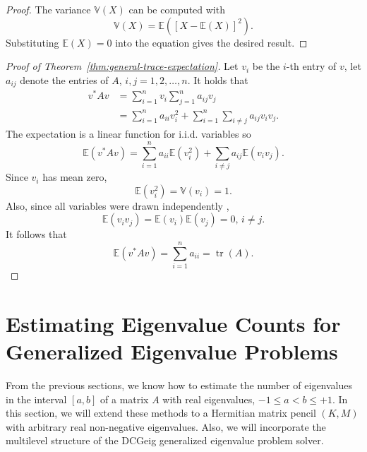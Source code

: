 \documentclass[%
	paper=a4,
	fontsize=10pt,
	DIV11,BCOR10mm,
	numbers=noenddot,
	abstract=yes
]{scrartcl}
\theoremstyle{definition}
\begin{document}
\begin{proof}
	The variance $\mathbb{V}(X)$ can be computed with \cite[§24.6]{Kreyszig2011}
	\[ \mathbb{V}(X) = \mathbb{E}([X - \mathbb{E}(X)]^2). \]
	Substituting $\mathbb{E}(X) = 0$ into the equation gives the desired result.
\end{proof}

\begin{proof}[Proof of Theorem~\ref{thm:general-trace-expectation}]
	Let $v_i$ be the $i$-th entry of $v$, let $a_{ij}$ denote the entries of
	$A$, $i, j = 1, 2, \dotsc, n$. It holds that
	\begin{align*}
		v^* A v
		&= \sum_{i=1}^n v_i \sum_{j=1}^n a_{ij} v_j \\
		&= \sum_{i=1}^n a_{ii} v_i^2
		+ \sum_{i=1}^n \sum_{i \neq j} a_{ij} v_i v_j.
	\end{align*}
	The expectation is a linear function for i.i.d. variables
	\cite[§24.9]{Kreyszig2011} so
	\[
		\mathbb{E}(v^* A v) =
			\sum_{i=1}^n a_{ii} \mathbb{E}(v_i^2) +
			\sum_{i \neq j} a_{ij} \mathbb{E}(v_i v_j).
	\]
	Since $v_i$ has mean zero,
	\[ \mathbb{E}(v_i^2) = \mathbb{V}(v_i) = 1. \]
	Also, since all variables were drawn independently
	\cite[§24.9]{Kreyszig2011},
	\[ \mathbb{E}(v_i v_j) = \mathbb{E}(v_i) \mathbb{E}(v_j) = 0, \, i \neq j.\]
	It follows that
	\[ \mathbb{E}(v^* A v) = \sum_{i=1}^n a_{ii} = \operatorname{tr}(A). \]
\end{proof}



\section{Estimating Eigenvalue Counts for Generalized Eigenvalue Problems}

From the previous sections, we know how to estimate the number of eigenvalues in
the interval $[a, b]$ of a matrix $A$ with real eigenvalues, $-1 \leq a < b \leq
+1$. In this section, we will extend these methods to a Hermitian matrix pencil
$(K, M)$ with arbitrary real non-negative eigenvalues. Also, we will incorporate
the multilevel structure of the DCGeig generalized eigenvalue problem solver.
\end{document}
